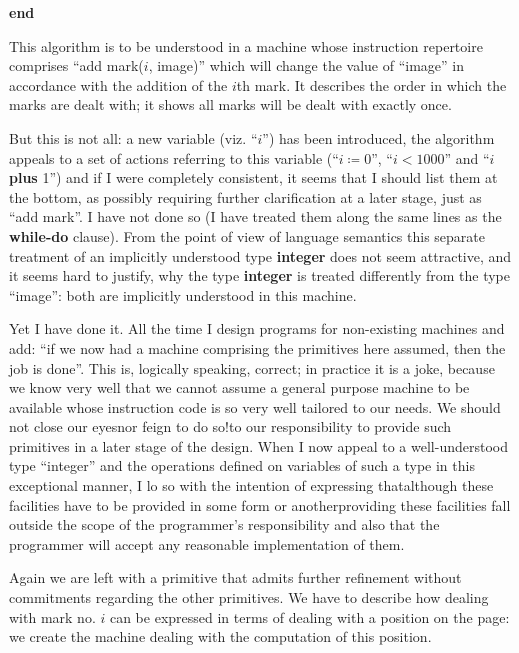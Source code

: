 \documentclass[twoside,11pt]{book}
\begin{document}
\textbf{end}

\noindent
This algorithm is to be understood in a machine whose instruction repertoire comprises ``add mark($i$, image)'' which will change the value of ``image'' in accordance with the addition of the $i$th mark. It describes the order in which the marks are dealt with; it shows all marks will be dealt with exactly once.

But this is not all: a new variable (viz. ``$i$'') has been introduced, the algorithm appeals to a set of actions referring to this variable (``$i \coloneq 0$'', \mbox{``$i < 1000$''} and ``$i$ \textbf{plus} 1'') and if I were completely consistent, it seems that I should list them at the bottom, as possibly requiring further clarification at a later stage, just as ``add mark''. I have not done so (I have treated them along the same lines as the \textbf{while-do} clause). From the point of view of language semantics this separate treatment of an implicitly understood type \textbf{integer} does not seem attractive, and it seems hard to justify, why the type \textbf{integer} is treated differently from the type ``image'': both are implicitly understood in this machine.

Yet I have done it. All the time I design programs for non-existing machines and add: ``if we now had a machine comprising the primitives here assumed, then the job is done''. This is, logically speaking, correct; in practice it is a joke, because we know very well that we cannot assume a general purpose machine to be available whose instruction code is so very well tailored to our needs. We should not close our eyes\textemdash{}nor feign to do so!\textemdash{}to our responsibility to provide such primitives in a later stage of the design. When I now appeal to a well-understood type ``integer'' and the operations defined on variables of such a type in this exceptional manner, I lo so with the intention of expressing that\textemdash{}although these facilities have to be provided in some form or another\textemdash{}providing these facilities fall outside the scope of the programmer's responsibility and also that the programmer will accept any reasonable implementation of them.

Again we are left with a primitive that admits further refinement without commitments regarding the other primitives. We have to describe how dealing with mark no. $i$ can be expressed in terms of dealing with a position on the page: we create the machine dealing with the computation of this position.
\end{document}
